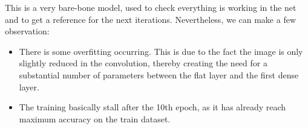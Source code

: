 This is a very bare-bone model, used to check everything is working in the net and to get a reference for the next iterations. Nevertheless, we can make a few observation:
\begin{itemize}
\item There is some overfitting occurring. This is due to the fact the image is only slightly reduced in the convolution, thereby creating the need for a substantial number of parameters between the flat layer and the first dense layer.
\item The training basically stall after the 10th epoch, as it has already reach maximum accuracy on the train dataset.
\end{itemize}


